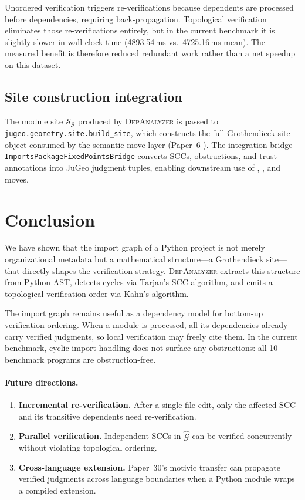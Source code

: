 \documentclass[11pt]{article}
\newcommand{\IG}{\mathcal{G}}              %
\newcommand{\DA}{\textsc{DepAnalyzer}}     %
\newcommand{\CondGraph}{\widehat{\IG}}     %
\newcommand{\ModSite}{\mathcal{S}_{\IG}}   %
\begin{document}
Unordered verification triggers re-verifications because dependents
are processed before dependencies, requiring back-propagation.
Topological verification eliminates those re-verifications entirely, but
in the current benchmark it is slightly slower in wall-clock time
(4893.54\,ms vs.\ 4725.16\,ms mean).  The measured benefit is therefore
reduced redundant work rather than a net speedup on this dataset.

\subsection{Site construction integration}

The module site $\ModSite$ produced by \DA{} is passed to
\texttt{jugeo.geometry.site.build\_site}, which constructs the full
Grothendieck site object consumed by the semantic move layer
(Paper~6 \cite{paper06}).  The integration bridge
\texttt{ImportsPackageFixedPointsBridge} converts SCCs, obstructions,
and trust annotations into JuGeo judgment tuples, enabling downstream
use of \VERIFY{}, \GLUE{}, and \REPAIR{} moves.

\section{Conclusion}
\label{sec:conclusion}

We have shown that the import graph of a Python project is not merely
organizational metadata but a mathematical structure—a Grothendieck
site—that directly shapes the verification strategy.  \DA{} extracts
this structure from Python AST, detects cycles via Tarjan's SCC
algorithm, and emits a topological verification order via Kahn's
algorithm.

The import graph remains useful as a dependency model for bottom-up
verification ordering.
When a module is processed, all its dependencies already carry
verified judgments, so local verification may freely cite them.
In the current benchmark, cyclic-import handling does not surface any
obstructions: all 10 benchmark programs are obstruction-free.

\paragraph{Future directions.}
\begin{enumerate}[label=(\roman*)]
  \item \textbf{Incremental re-verification.}
        After a single file edit, only the affected SCC and its
        transitive dependents need re-verification.
  \item \textbf{Parallel verification.}
        Independent SCCs in $\CondGraph$ can be verified
        concurrently without violating topological ordering.
  \item \textbf{Cross-language extension.}
        Paper~30's motivic transfer \cite{paper30} can propagate
        verified judgments across language boundaries when a Python
        module wraps a compiled extension.
\end{enumerate}
\end{document}
